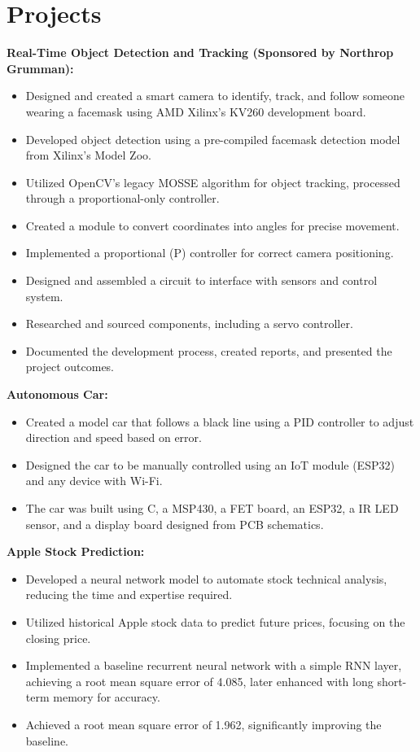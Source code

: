 \documentclass[letterpaper,9pt]{article}
\begin{document}
\section*{Projects}
\noindent \textbf{Real-Time Object Detection and Tracking (Sponsored by Northrop Grumman):}
\begin{itemize}[leftmargin=*,itemsep=0pt,topsep=0pt]
    \item Designed and created a smart camera to identify, track, and follow someone wearing a facemask using AMD Xilinx’s KV260 development board.
    \item Developed object detection using a pre-compiled facemask detection model from Xilinx’s Model Zoo.
    \item Utilized OpenCV’s legacy MOSSE algorithm for object tracking, processed through a proportional-only controller.
    \item Created a module to convert coordinates into angles for precise movement.
    \item Implemented a proportional (P) controller for correct camera positioning.
    \item Designed and assembled a circuit to interface with sensors and control system.
    \item Researched and sourced components, including a servo controller.
    \item Documented the development process, created reports, and presented the project outcomes.
\end{itemize}
\noindent \textbf{Autonomous Car:}
\begin{itemize}[leftmargin=*,itemsep=0pt,topsep=0pt]
    \item Created a model car that follows a black line using a PID controller to adjust direction and speed based on error.
    \item Designed the car to be manually controlled using an IoT module (ESP32) and any device with Wi-Fi.
    \item The car was built using C, a MSP430, a FET board, an ESP32, a IR LED sensor, and a display board designed from PCB schematics.
\end{itemize}
\noindent \textbf{Apple Stock Prediction:}
\begin{itemize}[leftmargin=*,itemsep=0pt,topsep=0pt]
    \item Developed a neural network model to automate stock technical analysis, reducing the time and expertise required.
    \item Utilized historical Apple stock data to predict future prices, focusing on the closing price.
    \item Implemented a baseline recurrent neural network with a simple RNN layer, achieving a root mean square error of 4.085, later enhanced with long short-term memory for accuracy.
    \item Achieved a root mean square error of 1.962, significantly improving the baseline.
\end{itemize}
\end{document}
